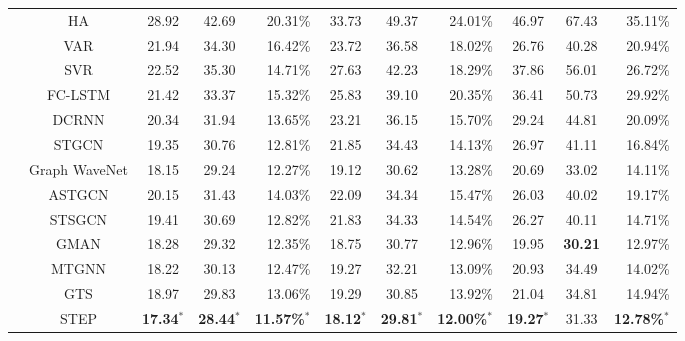 \documentclass[sigconf]{acmart}
\begin{document}
\begin{table*}[htpb]
\begin{tabular}{ccccr|ccr|ccr}
    \midrule  
    \midrule
    \color{black}{\multirow{14}*{\textbf{PEMS04}}}
      &HA              & 28.92  & 42.69  & 20.31\%        & 33.73  & 49.37  & 24.01\%       & 46.97  & 67.43  & 35.11\% \\ 
      &VAR             & 21.94  & 34.30  & 16.42\%        & 23.72  & 36.58  & 18.02\%        & 26.76  & 40.28  & 20.94\% \\ 
      &SVR             & 22.52  & 35.30  & 14.71\%        & 27.63  & 42.23  & 18.29\%       & 37.86  & 56.01  & 26.72\% \\ 
      &FC-LSTM         & 21.42  & 33.37  & 15.32\%        & 25.83  & 39.10  & 20.35\%       & 36.41  & 50.73  & 29.92\% \\ 
      &DCRNN           & 20.34  & 31.94  & 13.65\%        & 23.21  & 36.15  & 15.70\%       & 29.24  & 44.81  & 20.09\% \\ 
      &STGCN           & 19.35  & 30.76  & 12.81\%        & 21.85  & 34.43  & 14.13\%       & 26.97  & 41.11  & 16.84\% \\ 
      &Graph WaveNet   & 18.15  & 29.24  & 12.27\%        & 19.12  & 30.62  & 13.28\%       & 20.69  & 33.02  & 14.11\% \\
      &ASTGCN          & 20.15  & 31.43  & 14.03\%        & 22.09  & 34.34  & 15.47\%       & 26.03  & 40.02  & 19.17\% \\  
      &STSGCN          & 19.41  & 30.69  & 12.82\%        & 21.83  & 34.33  & 14.54\%       & 26.27  & 40.11  & 14.71\% \\  
      &GMAN            & 18.28  & 29.32  & 12.35\%        & 18.75  & 30.77  & 12.96\%       & 19.95  & \textbf{30.21}  & 12.97\% \\  
      &MTGNN           & 18.22  & 30.13  & 12.47\%        & 19.27  & 32.21  & 13.09\%       & 20.93  & 34.49  & 14.02\% \\  
      &GTS            & 18.97  & 29.83  & 13.06\%        & 19.29  & 30.85  & 13.92\%       & 21.04  & 34.81  & 14.94\% \\  
    \cmidrule(r){2-11}
      &STEP      & \textbf{17.34}$^*$  & \textbf{28.44}$^*$  & \textbf{11.57\%}$^*$        & \textbf{18.12}$^*$  & \textbf{29.81}$^*$  & \textbf{12.00\%}$^*$      & \textbf{19.27}$^*$  & 31.33  & \textbf{12.78\%}$^*$ \\ 
        \midrule
      \bottomrule
    \end{tabular}
  \end{table*} 
\end{document}
